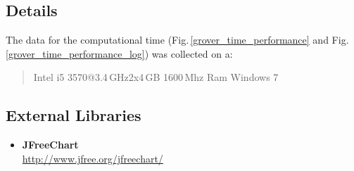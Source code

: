 \documentclass[bibliography=totocnumbered, 10pt]{article}
\theoremstyle{NoticeStyle}
\begin{document}
\subsection{Details}
The data for the computational time (Fig.\,\ref{grover_time_performance} and Fig.\,\ref{grover_time_performance_log}) was collected on a:

\begin{quotation}
	Intel i5 3570@3.4\,GHz\quad\quad 2x4\,GB 1600\,Mhz Ram \quad\quad Windows 7
\end{quotation}

	


%

\newpage

{}

\nocite{Perry2012}
\nocite{BasicConceptsQC}

\label{sec:References}



{}
\subsection*{External Libraries}

\begin{itemize}
	\item \textbf{JFreeChart}\\
	{\scriptsize \url{http://www.jfree.org/jfreechart/}}
\end{itemize}
\end{document}
